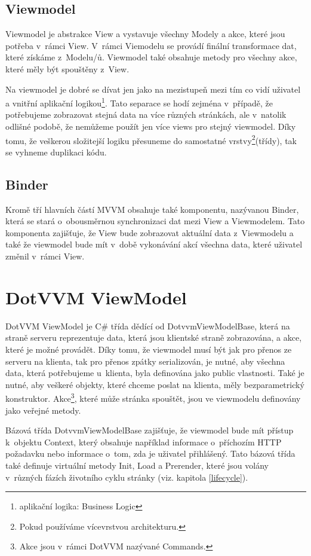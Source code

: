 \subsection*{Viewmodel}
Viewmodel je abstrakce View a vystavuje všechny Modely a akce, které jsou potřeba v~rámci View. V~rámci Viemodelu se provádí finální transformace dat, které získáme z~Modelu/ů. Viewmodel také obsahuje metody pro všechny akce, které měly být spouštěny z~View.

Na viewmodel je dobré se dívat jen jako na mezistupeň mezi tím co vidí uživatel a vnitřní aplikační logikou\footnote{aplikační logika: Business Logic}. Tato separace se hodí zejména v~případě, že potřebujeme zobrazovat stejná data na více různých stránkách, ale v~natolik odlišné podobě, že nemůžeme použít jen více views pro stejný viewmodel. Díky tomu, že veškerou složitejší logiku přesuneme do samostatné vrstvy\footnote{Pokud používáme vícevrstvou architekturu.}(třídy), tak se vyhneme duplikaci kódu.
\subsection*{Binder}
Kromě tří hlavních částí MVVM obsahuje také komponentu, nazývanou Binder, která se stará o~obousměrnou synchronizaci dat mezi View a Viewmodelem. Tato komponenta zajišťuje, že View bude zobrazovat aktuální data z~Viewmodelu a také že viewmodel bude mít v~době vykonávání akcí všechna data, které uživatel změnil v~rámci View.

\section{DotVVM ViewModel}

DotVVM ViewModel je C\# třída dědící od DotvvmViewModelBase, která na straně serveru reprezentuje data, která jsou klientské straně zobrazována, a akce, které je možné provádět.
Díky tomu, že viewmodel musí být jak pro přenos ze serveru na klienta, tak pro přenos zpátky serializován, je nutné, aby všechna data, která potřebujeme u~klienta, byla definována jako public vlastnosti. Také je nutné, aby veškeré objekty, které chceme poslat na klienta, měly bezparametrický konstruktor.
Akce\footnote{Akce jsou v~rámci DotVVM nazývané Commands.\cite{DotVVM-VM}}, které může stránka spouštět, jsou ve viewmodelu definovány jako veřejné metody.

Bázová třída DotvvmViewModelBase zajišťuje, že viewmodel bude mít přístup k~objektu Context, který obsahuje například informace o~příchozím HTTP požadavku nebo informace o~tom, zda je uživatel přihlášený.
Tato bázová třída také definuje virtuální metody Init, Load a Prerender, které jsou volány v~různých fázích životního cyklu stránky (viz. kapitola \ref{lifecycle}).

